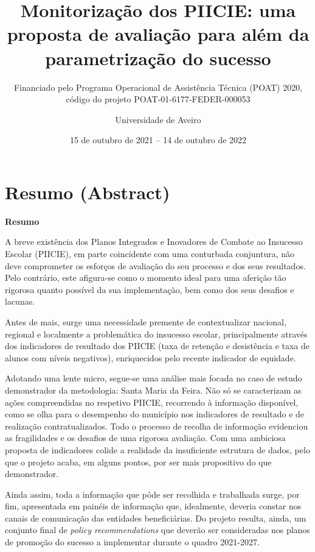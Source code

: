 \documentclass[
]{book}
\title{Monitorização dos PIICIE: uma proposta de avaliação para além da parametrização do sucesso}
\subtitle{Financiado pelo Programa Operacional de Assistência Técnica (POAT) 2020, código do projeto POAT-01-6177-FEDER-000053}
\author{Universidade de Aveiro}
\date{15 de outubro de 2021 -- 14 de outubro de 2022}
\begin{document}
\maketitle

{
\setcounter{tocdepth}{1}
\tableofcontents
}
\hypertarget{resumo-abstract}{%
\chapter*{\texorpdfstring{\textbf{Resumo (Abstract)}}{Resumo (Abstract)}}\label{resumo-abstract}}

\textbf{Resumo}

A breve existência dos Planos Integrados e Inovadores de Combate ao Insucesso Escolar (PIICIE), em parte coincidente com uma conturbada conjuntura, não deve comprometer os esforços de avaliação do seu processo e dos seus resultados. Pelo contrário, este afigura-se como o momento ideal para uma aferição tão rigorosa quanto possível da sua implementação, bem como dos seus desafios e lacunas.

Antes de mais, surge uma necessidade premente de contextualizar nacional, regional e localmente a problemática do insucesso escolar, principalmente através dos indicadores de resultado dos PIICIE (taxa de retenção e desistência e taxa de alunos com níveis negativos), enriquecidos pelo recente indicador de equidade.

Adotando uma lente micro, segue-se uma análise mais focada no caso de estudo demonstrador da metodologia: Santa Maria da Feira. Não só se caracterizam as ações compreendidas no respetivo PIICIE, recorrendo à informação disponível, como se olha para o desempenho do município nos indicadores de resultado e de realização contratualizados. Todo o processo de recolha de informação evidenciou as fragilidades e os desafios de uma rigorosa avaliação. Com uma ambiciosa proposta de indicadores colide a realidade da insuficiente estrutura de dados, pelo que o projeto acaba, em alguns pontos, por ser mais propositivo do que demonstrador.

Ainda assim, toda a informação que pôde ser recolhida e trabalhada surge, por fim, apresentada em painéis de informação que, idealmente, deveria constar nos canais de comunicação das entidades beneficiárias. Do projeto resulta, ainda, um conjunto final de \emph{policy recommendations} que deverão ser consideradas nos planos de promoção do sucesso a implementar durante o quadro 2021-2027.
\end{document}
